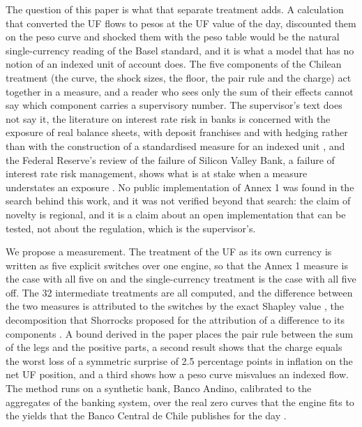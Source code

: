 The question of this paper is what that separate treatment adds. A calculation that converted the UF flows to pesos at the UF value of the day, discounted them on the peso curve and shocked them with the peso table would be the natural single-currency reading of the Basel standard, and it is what a model that has no notion of an indexed unit of account does. The five components of the Chilean treatment (the curve, the shock sizes, the floor, the pair rule and the charge) act together in a measure, and a reader who sees only the sum of their effects cannot say which component carries a supervisory number. The supervisor's text does not say it, the literature on interest rate risk in banks is concerned with the exposure of real balance sheets, with deposit franchises and with hedging rather than with the construction of a standardised measure for an indexed unit \citep{Hoffmann2019,Drechsler2021,English2018}, and the Federal Reserve's review of the failure of Silicon Valley Bank, a failure of interest rate risk management, shows what is at stake when a measure understates an exposure \citep{FRB_SVB}. No public implementation of Annex 1 was found in the search behind this work, and it was not verified beyond that search: the claim of novelty is regional, and it is a claim about an open implementation that can be tested, not about the regulation, which is the supervisor's.

We propose a measurement. The treatment of the UF as its own currency is written as five explicit switches over one engine, so that the Annex 1 measure is the case with all five on and the single-currency treatment is the case with all five off. The 32 intermediate treatments are all computed, and the difference between the two measures is attributed to the switches by the exact Shapley value \citep{Shapley1953}, the decomposition that Shorrocks proposed for the attribution of a difference to its components \citep{Shorrocks2013}. A bound derived in the paper places the pair rule between the sum of the legs and the positive parts, a second result shows that the charge equals the worst loss of a symmetric surprise of 2.5 percentage points in inflation on the net UF position, and a third shows how a peso curve misvalues an indexed flow. The method runs on a synthetic bank, Banco Andino, calibrated to the aggregates of the banking system, over the real zero curves that the engine fits to the yields that the Banco Central de Chile publishes for the day \citep{BCCh_BDE}.

